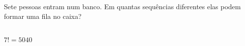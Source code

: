 \begin{ex}
Sete pessoas entram num banco. Em quantas sequências diferentes elas podem formar uma fila no caixa?
  \begin{sol}
   \phantom{A} \\
   $7!=5040$
  \end{sol}
\end{ex}